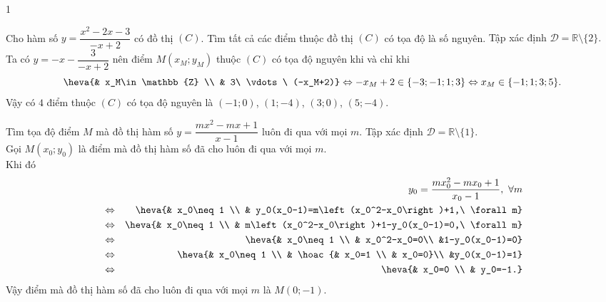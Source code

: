 \begin{bt}
{\begin{enumEX}{1}
{}
\end{enumEX}
}	
\end{bt}

\begin{bt}%
Cho hàm số $y=\dfrac{x^2-2x-3}{-x+2}$ có đồ thị $(C)$. Tìm tất cả các điểm thuộc đồ thị $(C)$ có tọa độ là số nguyên.
\loigiai
{Tập xác định $\mathscr{D}=\mathbb{R}\setminus\{2\}$.\\
Ta có $y=-x-\dfrac{3}{-x+2}$ nên điểm $M(x_M;y_M)$ thuộc $(C)$ có tọa độ nguyên khi và chỉ khi \[\heva{& x_M\in\mathbb{Z} \\ & 3\ \vdots\ (-x_M+2)}\Leftrightarrow -x_M+2\in\{-3;-1;1;3\}\Leftrightarrow x_M\in\{-1;1;3;5\}.
\]
Vậy có $4$ điểm thuộc $(C)$ có tọa độ nguyên là $(-1;0)$, $(1;-4)$, $(3;0)$, $(5;-4)$.
}
\end{bt}

\begin{bt}%
Tìm tọa độ điểm $M$ mà đồ thị hàm số $y=\dfrac{mx^2-mx+1}{x-1}$ luôn đi qua với mọi $m$.
\loigiai
{Tập xác định $\mathscr{D}=\mathbb{R}\setminus\{1\}$.\\
Gọi $M(x_0;y_0)$ là điểm mà đồ thị hàm số đã cho luôn đi qua với mọi $m$.\\
Khi đó \begin{eqnarray*}
&&y_0=\dfrac{mx_0^2-mx_0+1}{x_0-1},\ \forall m\\
&\Leftrightarrow & \heva{& x_0\neq 1 \\ & y_0(x_0-1)=m\left(x_0^2-x_0\right)+1,\ \forall m}\\
&\Leftrightarrow & \heva{& x_0\neq 1 \\ & m\left(x_0^2-x_0\right)+1-y_0(x_0-1)=0,\ \forall m}\\
&\Leftrightarrow &\heva{& x_0\neq 1 \\ & x_0^2-x_0=0\\ &1-y_0(x_0-1)=0}\\
&\Leftrightarrow & \heva{& x_0\neq 1 \\ & \hoac{& x_0=1 \\ & x_0=0}\\ &y_0(x_0-1)=1}\\
&\Leftrightarrow &\heva{& x_0=0 \\ & y_0=-1.}
\end{eqnarray*}
Vậy điểm mà đồ thị hàm số đã cho luôn đi qua với mọi $m$ là $M(0;-1)$.
}
\end{bt}

